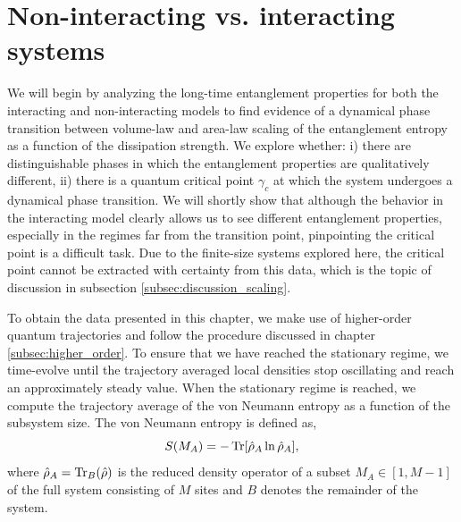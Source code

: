 \section{Non-interacting vs. interacting systems}

We will begin by analyzing the long-time entanglement properties for both the interacting and non-interacting models to find evidence of a dynamical phase transition between volume-law and area-law scaling of the entanglement entropy as a function of the dissipation strength. We explore whether: i) there are distinguishable phases in which the entanglement properties are qualitatively different, ii) there is a quantum critical point $\gamma_c$ at which the system undergoes a dynamical phase transition. We will shortly show that although the behavior in the interacting model clearly allows us to see different entanglement properties, especially in the regimes far from the transition point, pinpointing the critical point is a difficult task. Due to the finite-size systems explored here, the critical point cannot be extracted with certainty from this data, which is the topic of discussion in subsection \ref{subsec:discussion_scaling}. 

To obtain the data presented in this chapter, we make use of higher-order quantum trajectories and follow the procedure discussed in chapter \ref{subsec:higher_order}. To ensure that we have reached the stationary regime, we time-evolve until the trajectory averaged local densities stop oscillating and reach an approximately steady value. When the stationary regime is reached, we compute the trajectory average of the von Neumann entropy \cite{nielsen2000} as a function of the subsystem size. The von Neumann entropy is defined as,
\begin{equation}
    S(M_A) = -\Tr [\hat{\rho}_{A} \ln\hat{\rho}_{A}],
\end{equation}
where $\hat{\rho}_{A} = \Tr_B(\hat{\rho})$ is the reduced density operator of a subset $M_A \in [1,M-1]$ of the full system consisting of $M$ sites and $B$ denotes the remainder of the system.

